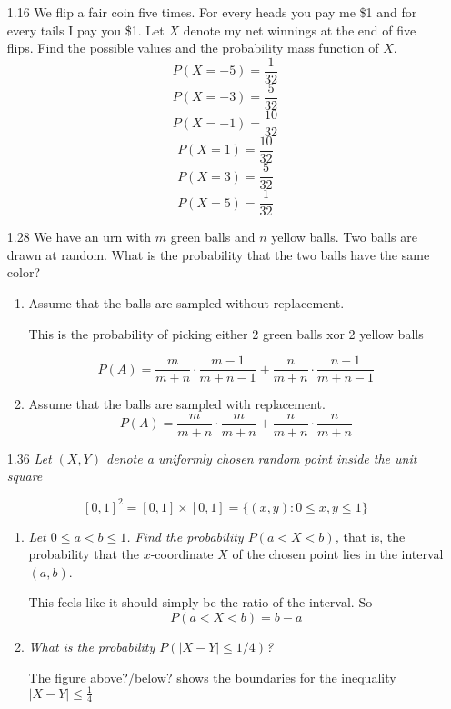 \documentclass[10pt]{article}
\begin{document}
\begin{itemize}
\newpage
\item[1.16] We flip a fair coin five times. For every heads you pay me \$1
  and for every tails I pay you \$1. Let $X$ denote my net winnings at the
  end of five flips. Find the possible values and the probability mass
  function of $X$.
    \[P(X = -5) = \frac{1}{32}\]
    \[P(X = -3) =  \frac{5}{32}\]
    \[P(X = -1) =  \frac{10}{32}\]
    \[P(X = 1) =  \frac{10}{32}\]
    \[P(X = 3) =  \frac{5}{32}\]
    \[P(X = 5) =  \frac{1}{32}\]



\newpage
\item[1.28] We have an urn with $m$ green balls and $n$ yellow balls. Two
  balls are drawn at random. What is the probability that the two balls
  have the same color?

  \begin{enumerate}
    \item Assume that the balls are sampled without replacement.

      This is the probability of picking either 2 green balls xor
      2 yellow balls

      \[ P(A) = \frac{m}{m+n} \cdot \frac{m-1}{m+n-1} + \frac{n}{m+n} \cdot \frac{n-1}{m+n-1}  \]
    \item Assume that the balls are sampled with replacement.
      \[ P(A) = \frac{m}{m+n} \cdot \frac{m}{m+n} + \frac{n}{m+n} \cdot \frac{n}{m+n}  \]
  \end{enumerate}

\newpage

\item[1.36] \textit{Let $(X, Y)$ denote a uniformly chosen random
  point inside the unit square}

\[ [0,1]^{2}=[0,1] \times[0,1]=\{(x, y): 0 \leq x, y \leq 1\} \]

  \begin{enumerate}
    \item \textit{Let $0 \leq a < b \leq 1$. Find the probability $P(a<X<b)$,}
      that is, the probability that the $x$-coordinate $X$ of the chosen
      point lies in the interval $(a, b)$.

      This feels like it should simply be the ratio of the interval.  So
      \[ P(a < X < b) = b - a \]

    \item \textit{What is the probability $P(|X-Y| \leq 1 / 4)$?}

      The figure above?/below? shows the boundaries for the inequality
      $|X-Y| \leq \frac{1}{4} $


\end{enumerate}
\end{itemize}
\end{document}
